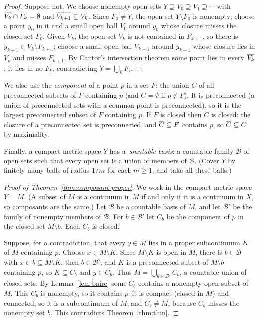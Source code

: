 \begin{proof}
Suppose not. We choose nonempty open sets $Y\supseteq V_0\supseteq V_1\supseteq\cdots$ with
$\overline{V_{k}}\cap F_k=\emptyset$ and $\overline{V_{k+1}}\subseteq V_k$. Since $F_0\neq Y$, the open set
$Y\setminus F_0$ is nonempty; choose a point $y_0$ in it and a small open ball $V_0$ around $y_0$
whose closure misses the closed set $F_0$. Given $V_k$, the open set $V_k$ is not contained in
$F_{k+1}$, so there is $y_{k+1}\in V_k\setminus F_{k+1}$; choose a small open ball $V_{k+1}$ around
$y_{k+1}$ whose closure lies in $V_k$ and misses $F_{k+1}$. By Cantor's intersection theorem
 some point lies in every $\overline{V_k}$; it lies in no $F_k$, contradicting
$Y=\bigcup_kF_k$.
\end{proof}

We also use the \emph{component} of a point $p$ in a set $F$: the union $C$ of all preconnected
subsets of $F$ containing $p$ (and $C=\emptyset$ if $p\notin F$). It is preconnected (a union of
preconnected sets with a common point is preconnected), so it is the largest preconnected subset
of $F$ containing $p$. If $F$ is closed then $C$ is closed: the closure of a preconnected set is
preconnected, and $\overline{C}\subseteq F$ contains $p$, so $\overline{C}\subseteq C$ by maximality.

Finally, a compact metric space $Y$ has a \emph{countable basis}: a countable family $\mathcal B$
of open sets such that every open set is a union of members of $\mathcal B$. (Cover $Y$ by
finitely many balls of radius $1/m$ for each $m\ge1$, and take all these balls.)

\begin{proof}[Proof of Theorem~\ref{thm:composant-proper}]
We work in the compact metric space $Y=M$. (A subset of $M$ is a continuum in $M$ if and only if it
is a continuum in $X$, so composants are the same.) Let $\mathcal B$ be a countable basis of $M$,
and let $\mathcal B'$ be the family of nonempty members of $\mathcal B$. For $b\in\mathcal B'$ let
$C_b$ be the component of $p$ in the closed set $M\setminus b$. Each $C_b$ is closed.

Suppose, for a contradiction, that every $y\in M$ lies in a proper subcontinuum $K$ of $M$ containing
$p$. Choose $x\in M\setminus K$. Since $M\setminus K$ is open in $M$, there is $b\in\mathcal B$ with
$x\in b\subseteq M\setminus K$; then $b\in\mathcal B'$, and $K$ is a preconnected subset of
$M\setminus b$ containing $p$, so $K\subseteq C_b$ and $y\in C_b$. Thus
$M=\bigcup_{b\in\mathcal B'}C_b$, a countable union of closed sets. By Lemma~\ref{lem:baire} some
$C_b$ contains a nonempty open subset of $M$. This $C_b$ is nonempty, so it contains $p$; it is
compact (closed in $M$) and connected, so it is a subcontinuum of $M$; and $C_b\neq M$, because
$C_b$ misses the nonempty set $b$. This contradicts Theorem~\ref{thm:thin}.
\end{proof}

